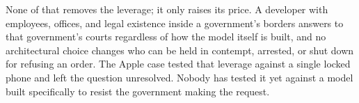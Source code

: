 None of that removes the leverage; it only raises its price. A developer with employees, offices, and legal existence inside a government's borders answers to that government's courts regardless of how the model itself is built, and no architectural choice changes who can be held in contempt, arrested, or shut down for refusing an order. The Apple case tested that leverage against a single locked phone and left the question unresolved. Nobody has tested it yet against a model built specifically to resist the government making the request.
